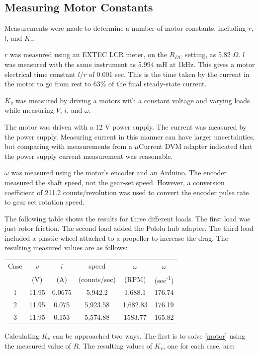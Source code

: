 \documentclass[12pt,letterpaper]{article}
\begin{document}
\begin{appendices}
\section{Measuring Motor Constants}
\label{appendix:measure}
Measurements were made to determine a number of motor constants, including $r$, $l$, and $K_{v}$.  

$r$ was measured using an EXTEC LCR meter, on the $R_{DC}$ setting, as 5.82 $\Omega$. $l$ was 
measured with the same instrument as 5.994 mH at 1kHz.  This gives a motor electrical time constant $l/r$ of 0.001 sec.  This is the time taken by the current in the motor to go from rest to 63\% of the final steady-state current.

$K_{v}$ was measured by driving a motors with a constant voltage and
varying loads while measuring $V$, $i$, and $\omega$.  


The motor was driven with a 12 V power supply.  The current was measured by the power supply.  Measuring current in this manner can have larger uncertainties, but comparing with measurements from a $\mu$Current DVM adapter indicated that the power supply current measurement was reasonable.  


$\omega$ was measured using the motor's encoder and an Arduino.  The encoder measured the shaft speed, not the gear-set speed.  However, a conversion coefficient of 211.2 counts/revolution was used to convert the encoder pulse rate to gear set rotation speed.

The following table shows the results for three different loads.  The first load was just rotor friction.  The second load added the Pololu hub adapter.  The third load included a plastic wheel attached to a propeller to increase the drag.
The resulting measured values are as follows: \\

\begin{tabular}{|c|c|c|c|c|c|}
\hline
Case & $v$ & $i$ & speed & $\omega$ & $\omega$ \\
      & (V) &  (A) & (counts/sec) & (RPM) & (sec\textsuperscript{-1}) \\
\hline
1    & 11.95 & 0.0675 & 5,942.2   & 1,688.1   & 176.74 \\
2    & 11.95 & 0.075   & 5,923.58 & 1,682.83 & 176.19 \\ 
3    & 11.95 & 0.153   & 5,574.88 & 1583.77  & 165.82 \\
\hline
\end{tabular}

Calculating $K_{v}$ can be approached two ways.  The first is to solve \eqref{motor} using the measured
value of $R$.  The resulting values of $K_{v}$, one for each case, are:


\end{appendices}
\end{document}
